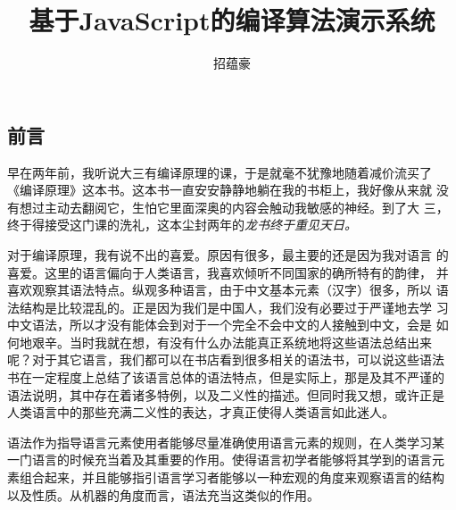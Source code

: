 \documentclass[12pt,leqno]{book}
\begin{document}
\begin{CJK}{UTF8}{gbsn}

\title{\bf{基于JavaScript的编译算法演示系统}}
\author{招蕴豪}
\maketitle

\tableofcontents
{}

\chapter*{前言}
\pagestyle{plain}

早在两年前，我听说大三有编译原理的课，于是就毫不犹豫地随着减价流买了
《编译原理》这本书。这本书一直安安静静地躺在我的书柜上，我好像从来就
没有想过主动去翻阅它，生怕它里面深奥的内容会触动我敏感的神经。到了大
三，终于得接受这门课的洗礼，这本尘封两年的\em{龙书}终于重见天日。

对于编译原理，我有说不出的喜爱。原因有很多，最主要的还是因为我对语言
的喜爱。这里的语言偏向于人类语言，我喜欢倾听不同国家的确所特有的韵律，
并喜欢观察其语法特点。纵观多种语言，由于中文基本元素（汉字）很多，所以
语法结构是比较混乱的。正是因为我们是中国人，我们没有必要过于严谨地去学
习中文语法，所以才没有能体会到对于一个完全不会中文的人接触到中文，会是
如何地艰辛。当时我就在想，有没有什么办法能真正系统地将这些语法总结出来
呢？对于其它语言，我们都可以在书店看到很多相关的语法书，可以说这些语法
书在一定程度上总结了该语言总体的语法特点，但是实际上，那是及其不严谨的
语法说明，其中存在着诸多特例，以及二义性的描述。但同时我又想，或许正是
人类语言中的那些充满二义性的表达，才真正使得人类语言如此迷人。

语法作为指导语言元素使用者能够尽量准确使用语言元素的规则，在人类学习某
一门语言的时候充当着及其重要的作用。使得语言初学者能够将其学到的语言元
素组合起来，并且能够指引语言学习者能够以一种宏观的角度来观察语言的结构
以及性质。从机器的角度而言，语法充当这类似的作用。




\end{CJK}
\end{document}
